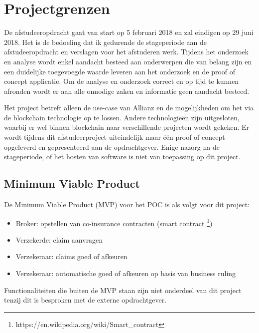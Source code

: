 \chapter{Projectgrenzen}
De afstudeeropdracht gaat van start op 5 februari 2018 en zal eindigen op 29 juni 2018. Het is de bedoeling dat ik gedurende de stageperiode aan de afstudeeropdracht en verslagen voor het afstuderen werk. Tijdens het onderzoek en analyse wordt enkel aandacht besteed aan onderwerpen die van belang zijn en een duidelijke toegevoegde waarde leveren aan het onderzoek en de proof of concept applicatie. Om de analyse en onderzoek correct en op tijd te kunnen afronden wordt er aan alle onnodige zaken en informatie geen aandacht besteed.\par
Het project betreft alleen de use-case van Allianz en de mogelijkheden om het via de blockchain technologie op te lossen. Andere technologieën zijn uitgesloten, waarbij er wel binnen blockchain naar verschillende projecten wordt gekeken. Er wordt tijdens dit afstudeerproject uiteindelijk maar één proof of concept opgeleverd en gepresenteerd aan de opdrachtgever. Enige nazorg na de stageperiode, of het hosten van software is niet van toepassing op dit project.

\section{Minimum Viable Product}
De Minimum Viable Product (MVP) voor het POC is als volgt voor dit project:
\begin{itemize}
  \item Broker: opstellen van co-insurance contracten (smart contract \footnote{https://en.wikipedia.org/wiki/Smart\_contract})
  \item Verzekerde: claim aanvragen
  \item Verzekeraar: claims goed of afkeuren
  \item Verzekeraar: automatische goed of
afkeuren op basis van business ruling
\end{itemize}
Functionaliteiten die buiten de MVP staan zijn niet onderdeel van dit project tenzij dit is besproken met de externe opdrachtgever.